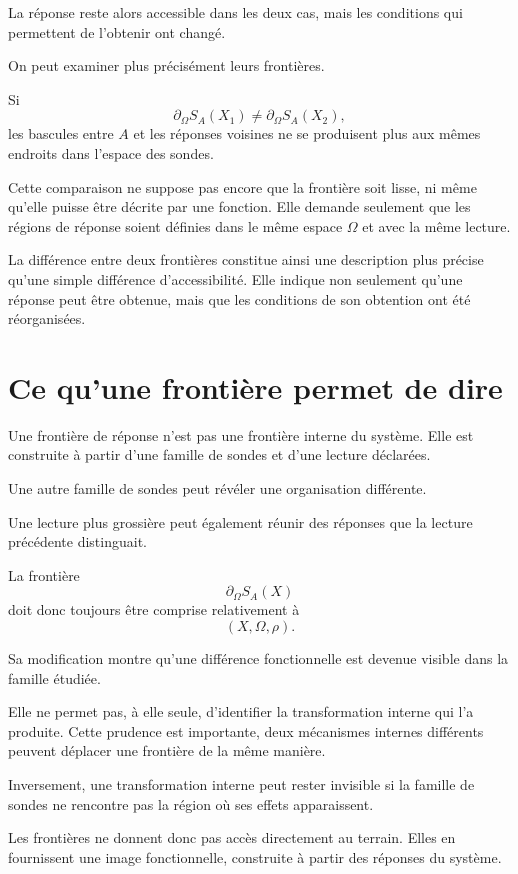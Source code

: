 La réponse reste alors accessible dans les deux cas, mais les conditions qui permettent de l'obtenir ont changé.

On peut examiner plus précisément leurs frontières.

Si
\[
\partial_\Omega S_A(X_1)
\neq
\partial_\Omega S_A(X_2),
\]
les bascules entre $A$ et les réponses voisines ne se produisent plus aux mêmes endroits dans l'espace des sondes.

Cette comparaison ne suppose pas encore que la frontière soit lisse, ni même qu'elle puisse être décrite par une fonction. Elle demande seulement que les régions de réponse soient définies dans le même espace $\Omega$ et avec la même lecture.

La différence entre deux frontières constitue ainsi une description plus précise qu'une simple différence d'accessibilité. Elle indique non seulement qu'une réponse peut être obtenue, mais que les conditions de son obtention ont été réorganisées.

\section{Ce qu'une frontière permet de dire}
\label{t3-ce-que-frontiere-permet-dire}

Une frontière de réponse n'est pas une frontière interne du système. Elle est construite à partir d'une famille de sondes et d'une lecture déclarées.

Une autre famille de sondes peut révéler une organisation différente.

Une lecture plus grossière peut également réunir des réponses que la
lecture précédente distinguait.

La frontière
\[
\partial_\Omega S_A(X)
\]
doit donc toujours être comprise relativement à
\[
(X,\Omega,\rho).
\]

Sa modification montre qu'une différence fonctionnelle est devenue visible dans la famille étudiée.

Elle ne permet pas, à elle seule, d'identifier la transformation interne qui l'a produite. Cette prudence est importante, deux mécanismes internes différents peuvent déplacer une frontière de la même manière.

Inversement, une transformation interne peut rester invisible si la
famille de sondes ne rencontre pas la région où ses effets apparaissent.

Les frontières ne donnent donc pas accès directement au terrain. Elles en fournissent une image fonctionnelle, construite à partir des réponses du système.

